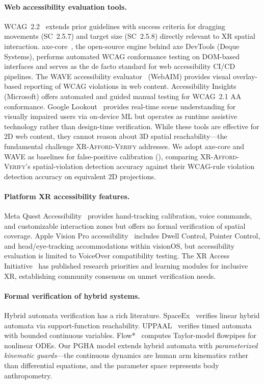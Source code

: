 \documentclass[11pt,letterpaper]{article}
\newcommand{\tool}{\textsc{XR-Afford-Verify}}
\begin{document}
\paragraph{Web accessibility evaluation tools.}
WCAG~2.2~\cite{wcag22} extends prior guidelines with success criteria for dragging movements (SC~2.5.7) and target size (SC~2.5.8) directly relevant to XR spatial interaction.
axe-core~\cite{axe-core}, the open-source engine behind axe DevTools (Deque Systems), performs automated WCAG conformance testing on DOM-based interfaces and serves as the de facto standard for web accessibility CI/CD pipelines.
The WAVE accessibility evaluator~\cite{wave} (WebAIM) provides visual overlay-based reporting of WCAG violations in web content.
Accessibility Insights~\cite{a11y-insights} (Microsoft) offers automated and guided manual testing for WCAG~2.1 AA conformance.
Google Lookout~\cite{google-lookout} provides real-time scene understanding for visually impaired users via on-device ML but operates as runtime assistive technology rather than design-time verification.
While these tools are effective for 2D web content, they cannot reason about 3D spatial reachability---the fundamental challenge \tool{} addresses.
We adopt axe-core and WAVE as baselines for false-positive calibration (), comparing \tool{}'s spatial-violation detection accuracy against their WCAG-rule violation detection accuracy on equivalent 2D projections.

\paragraph{Platform XR accessibility features.}
Meta Quest Accessibility~\cite{meta-quest-a11y} provides hand-tracking calibration, voice commands, and customizable interaction zones but offers no formal verification of spatial coverage.
Apple Vision Pro accessibility~\cite{apple-visionpro-a11y} includes Dwell Control, Pointer Control, and head/eye-tracking accommodations within visionOS, but accessibility evaluation is limited to VoiceOver compatibility testing.
The XR Access Initiative~\cite{xraccess2021} has published research priorities and learning modules for inclusive XR, establishing community consensus on unmet verification needs.

\paragraph{Formal verification of hybrid systems.}
Hybrid automata verification has a rich literature.
SpaceEx~\cite{frehse2011} verifies linear hybrid automata via support-function reachability.
UPPAAL~\cite{uppaal} verifies timed automata with bounded continuous variables.
Flow*~\cite{flowstar} computes Taylor-model flowpipes for nonlinear ODEs.
Our PGHA model extends hybrid automata with \emph{parameterized kinematic guards}---the continuous dynamics are human arm kinematics rather than differential equations, and the parameter space represents body anthropometry.
\end{document}
